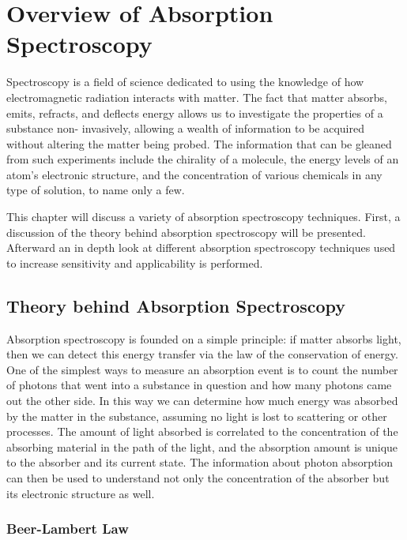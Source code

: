 \chapter{Overview of Absorption Spectroscopy}\label{ch:overview}

Spectroscopy is a field of science dedicated to using the knowledge of how
electromagnetic radiation interacts with matter. The fact that matter absorbs,
emits, refracts, and deflects energy allows us to investigate the properties of
a substance non- invasively, allowing a wealth of information to be acquired
without altering the matter being probed. The information that can be gleaned
from such experiments include the chirality of a molecule, the energy levels of
an atom's electronic structure, and the concentration of various chemicals in
any type of solution, to name only a few.

This chapter will discuss a variety of absorption spectroscopy techniques.
First, a discussion of the theory behind absorption spectroscopy will be
presented. Afterward an in depth look at different absorption spectroscopy
techniques used to increase sensitivity and applicability is performed.



\section{Theory behind Absorption Spectroscopy}\label{sec:abs_theory}

Absorption spectroscopy is founded on a simple principle: if matter absorbs
light, then we can detect this energy transfer via the law of the conservation
of energy. One of the simplest ways to measure an absorption event is to count
the number of photons that went into a substance in question and how many
photons came out the other side. In this way we can determine how much energy
was absorbed by the matter in the substance, assuming no light is lost to
scattering or other processes. The amount of light absorbed is correlated to
the concentration of the absorbing material in the path of the light, and the
absorption amount is unique to the absorber and its current state. The
information about photon absorption can then be used to understand not only the
concentration of the absorber but its electronic structure as well.



\subsection{Beer-Lambert Law}\label{subsec:beer}

